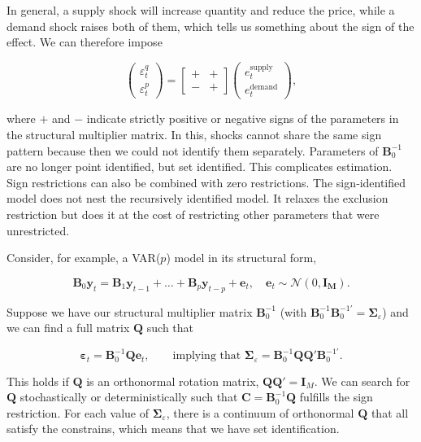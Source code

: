In general, a supply shock will increase quantity and reduce the price, while a demand shock raises both of them, which tells us something about the sign of the effect. We can therefore impose

\[
	\begin{pmatrix}
		\varepsilon_t^q \\
		\varepsilon_t^p
	\end{pmatrix}
	=
	\begin{bmatrix}
		+ & + \\
		- & +
	\end{bmatrix}
	\begin{pmatrix}
		e_t^{\text{supply}} \\
		e_t^{\text{demand}}
	\end{pmatrix},
\]

where $+$ and $-$ indicate strictly positive or negative signs of the parameters in the structural multiplier matrix. In this, shocks cannot share the same sign pattern because then we could not identify them separately. Parameters of $\bm{B}_0^{-1}$ are no longer point identified, but set identified. This complicates estimation. Sign restrictions can also be combined with zero restrictions. The sign‐identified model does not nest the recursively identified model. It relaxes the exclusion restriction but does it at the cost of restricting other parameters that were unrestricted.

Consider, for example, a VAR($p$) model in its structural form,

\[
	\bm{B}_0 \bm{y}_t=\bm{B}_1 \bm{y}_{t-1}+\ldots+\bm{B}_p \bm{y}_{t-p}+\bm{e}_t, \quad \bm{e}_t \sim \mathcal{N}\left(0, \bm{I}_{\bm{M}}\right).
\]

Suppose we have our structural multiplier matrix $\bm{B}_0^{-1}$ (with $\bm{B}_0^{-1}\bm{B}_0^{-1\prime} = \bm{\Sigma}_\varepsilon$) and we can find a full matrix $\bm{Q}$ such that

\[
	\bm{\varepsilon}_t = \bm{B}_0^{-1}\bm{Q}\bm{e}_t, \qquad\text{implying that } \bm{\Sigma}_\varepsilon = \bm{B}_0^{-1} \bm{QQ}'\bm{B}_0^{-1\prime}.
\]

This holds if $\bm{Q}$ is an orthonormal rotation matrix, $\bm{QQ}' = \bm{I}_M$. We can search for $\bm{Q}$ stochastically or deterministically such that $\bm{C} = \bm{B}_0^{-1}\bm{Q}$ fulfills the sign restriction. For each value of $\bm{\Sigma}_\varepsilon$, there is a continuum of orthonormal $\bm{Q}$ that all satisfy the constrains, which means that we have set identification.

